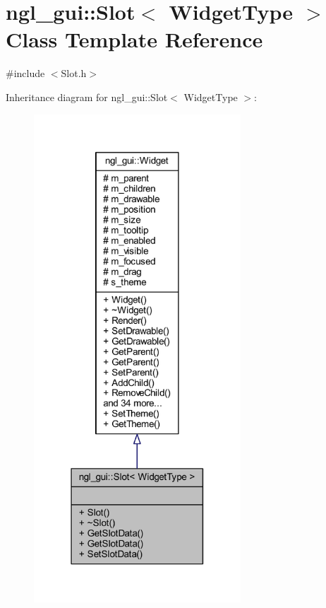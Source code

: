 \hypertarget{classngl__gui_1_1_slot}{}\section{ngl\+\_\+gui\+:\+:Slot$<$ Widget\+Type $>$ Class Template Reference}
\label{classngl__gui_1_1_slot}


{\ttfamily \#include $<$Slot.\+h$>$}



Inheritance diagram for ngl\+\_\+gui\+:\+:Slot$<$ Widget\+Type $>$\+:\nopagebreak
\begin{figure}[H]
\begin{center}
\leavevmode
\includegraphics[width=220pt]{classngl__gui_1_1_slot__inherit__graph}
\end{center}
\end{figure}


